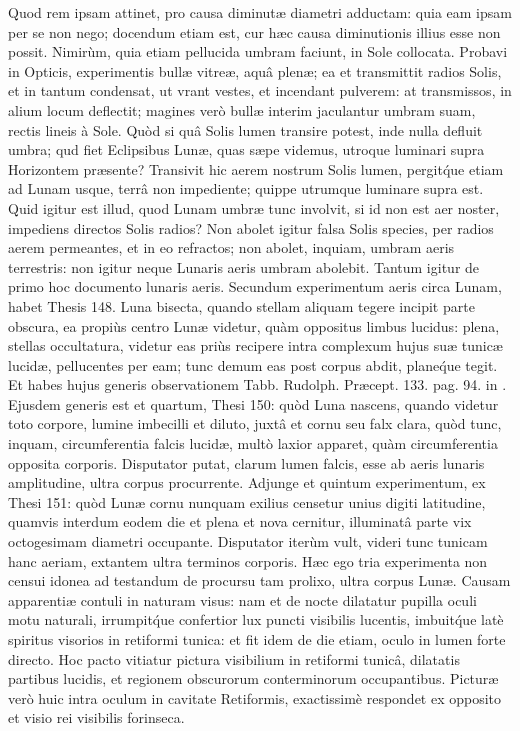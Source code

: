 \documentclass[a4paper, 11pt, oneside, polutonikogreek, german]{article}
\begin{document}
Quod rem ipsam attinet, pro causa diminutæ diametri adductam: quia eam ipsam per se non nego; docendum etiam est, cur hæc causa diminutionis illius esse non possit. Nimirùm, quia etiam pellucida umbram faciunt, in Sole collocata. Probavi in Opticis, experimentis bullæ vitreæ, aquâ plenæ; ea et transmittit radios Solis, et in tantum condensat, ut vrant vestes, et incendant pulverem: at transmissos, in alium locum deflectit; magines verò bullæ interim jaculantur umbram suam, rectis lineis à Sole. Quòd si quâ Solis lumen transire potest, inde nulla defluit umbra; qud fiet Eclipsibus Lunæ, quas sæpe videmus, utroque luminari supra Horizontem præsente? Transivit hic aerem nostrum Solis lumen, pergit\'que etiam ad Lunam usque, terrâ non impediente; quippe utrumque luminare supra est. Quid igitur est illud, quod Lunam umbræ tunc involvit, si id non est aer noster, impediens directos Solis radios? Non abolet igitur falsa Solis species, per radios aerem permeantes, et in eo refractos; non abolet, inquiam, umbram aeris terrestris: non igitur neque Lunaris aeris umbram abolebit. Tantum igitur de primo hoc documento lunaris aeris.\hspace*{5mm}
Secundum experimentum aeris circa Lunam, habet Thesis 148. Luna bisecta, quando stellam aliquam tegere incipit parte obscura, ea propiùs centro Lunæ videtur, quàm oppositus limbus lucidus: plena, stellas occultatura, videtur eas priùs recipere intra complexum hujus suæ tunicæ lucidæ, pellucentes per eam; tunc demum eas post corpus abdit, plane\'que tegit. Et habes hujus generis observationem Tabb. Rudolph. Præcept. 133. pag. 94. in \mars\hspace*{0.5mm}\rightmoon\hspace*{0.5mm}\venus. Ejusdem generis est et quartum, Thesi 150: quòd Luna nascens, quando videtur toto corpore, lumine imbecilli et diluto, juxtâ et cornu seu falx clara, quòd tunc, inquam, circumferentia falcis lucidæ, multò laxior apparet, quàm circumferentia opposita corporis. Disputator putat, clarum lumen falcis, esse ab aeris lunaris amplitudine, ultra corpus procurrente. Adjunge et quintum experimentum, ex Thesi 151: quòd Lunæ cornu nunquam exilius censetur unius digiti latitudine, quamvis interdum eodem die et plena et nova cernitur, illuminatâ parte vix octogesimam diametri occupante. Disputator iterùm vult, videri tunc tunicam hanc aeriam, extantem ultra terminos corporis.\hspace*{5mm}
Hæc ego tria experimenta non censui idonea ad testandum de procursu tam prolixo, ultra corpus Lunæ. Causam apparentiæ contuli in naturam visus: nam et de nocte dilatatur pupilla oculi motu naturali, irrumpit\'que confertior lux puncti visibilis lucentis, imbuit\'que latè spiritus visorios in retiformi tunica: et fit idem de die etiam, oculo in lumen forte directo. Hoc pacto vitiatur pictura visibilium in retiformi tunicâ, dilatatis partibus lucidis, et regionem obscurorum conterminorum occupantibus. Picturæ verò huic intra oculum in cavitate Retiformis, exactissimè respondet ex opposito et visio rei visibilis forinseca.\hspace*{5mm}
\end{document}
